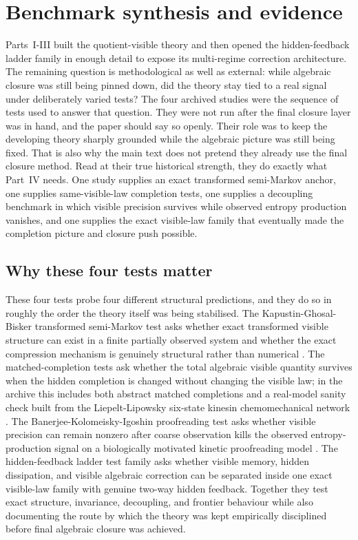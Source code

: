 \documentclass[11pt]{article}
\numberwithin{equation}{section}
\theoremstyle{thmcompact}
\theoremstyle{remark}
\begin{document}
\section{Benchmark synthesis and evidence}
\label{sec:10_benchmark_synthesis}

Parts~I-III built the quotient-visible theory and then opened the hidden-feedback ladder family in enough detail to expose its multi-regime correction architecture. The remaining question is methodological as well as external: while algebraic closure was still being pinned down, did the theory stay tied to a real signal under deliberately varied tests? The four archived studies were the sequence of tests used to answer that question. They were not run after the final closure layer was in hand, and the paper should say so openly. Their role was to keep the developing theory sharply grounded while the algebraic picture was still being fixed. That is also why the main text does not pretend they already use the final closure method. Read at their true historical strength, they do exactly what Part~IV needs. One study supplies an exact transformed semi-Markov anchor, one supplies same-visible-law completion tests, one supplies a decoupling benchmark in which visible precision survives while observed entropy production vanishes, and one supplies the exact visible-law family that eventually made the completion picture and closure push possible.

\subsection{Why these four tests matter}

These four tests probe four different structural predictions, and they do so in roughly the order the theory itself was being stabilised. The Kapustin-Ghosal-Bisker transformed semi-Markov test asks whether exact transformed visible structure can exist in a finite partially observed system and whether the exact compression mechanism is genuinely structural rather than numerical \citep{KapustinGhosalBisker2024}. The matched-completion tests ask whether the total algebraic visible quantity survives when the hidden completion is changed without changing the visible law; in the archive this includes both abstract matched completions and a real-model sanity check built from the Liepelt-Lipowsky six-state kinesin chemomechanical network \citep{LiepeltLipowsky2007}. The Banerjee-Kolomeisky-Igoshin proofreading test asks whether visible precision can remain nonzero after coarse observation kills the observed entropy-production signal on a biologically motivated kinetic proofreading model \citep{BanerjeeKolomeiskyIgoshin2017}. The hidden-feedback ladder test family asks whether visible memory, hidden dissipation, and visible algebraic correction can be separated inside one exact visible-law family with genuine two-way hidden feedback. Together they test exact structure, invariance, decoupling, and frontier behaviour while also documenting the route by which the theory was kept empirically disciplined before final algebraic closure was achieved.
\end{document}
